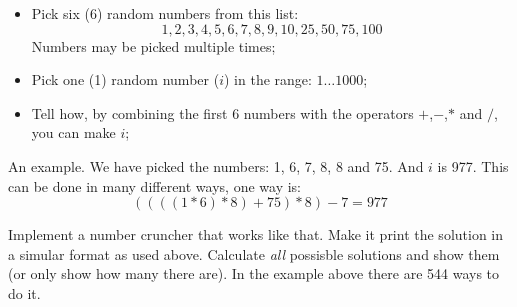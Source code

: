 \begin{Exercise}[title={Number cruncher},difficulty=9]
\label{ex:numbercruncher}
\begin{itemize}
\item{Pick six (6) random numbers from this list:
$$1, 2, 3, 4, 5, 6, 7, 8, 9, 10, 25, 50, 75, 100$$
Numbers may be picked multiple times;}
\item{Pick one (1) random number ($i$) in the range: $1 \ldots 1000$;}
\item{Tell how, by combining the first 6 numbers with the operators
$+$,$-$,$*$ and $/$, you can make $i$;}
\end{itemize}
An example. We have picked the numbers: 1, 6, 7, 8, 8 and 75. And $i$ is
977. This can be done in many different ways, one way is:
$$ ((((1 * 6) * 8) + 75) * 8) - 7 = 977$$

\Question\label{ex:cruncher q1}
Implement a number cruncher that works like that. Make it print the
solution in a simular format as used above.
\Question\label{ex:cruncher q2}
Calculate \emph{all} possisble solutions and show them (or only show how
many there are). In the example above there are 544 ways to do it.
\end{Exercise}

\begin{Answer}
\Question 
\end{Answer}
